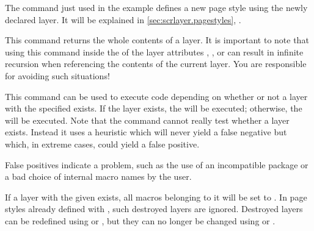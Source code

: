 The 
command just used in the example defines a new page style using the newly
declared layer. It will be explained in \autoref{sec:scrlayer.pagestyles},
.%
\EndIndexGroup


\begin{Declaration}
\end{Declaration}
This command returns the whole contents
of a layer. It is important to note that using this
command inside the  of the layer attributes ,
, or  can result in
infinite recursion when referencing the contents of the current layer. You
are responsible for avoiding such situations!%
\EndIndexGroup


\begin{Declaration}
\end{Declaration}
This command can be used to execute code depending on whether or not a layer
with the specified  exists. If the layer exists, the
 will be executed; otherwise, the  will be
executed. Note that the command cannot really test whether a layer exists.
Instead it uses a heuristic which will never yield a false negative but which,
in extreme cases, could yield a false positive.
\iffalse%
Nevertheless, if the test yields a false positive, something has gone wrong.
For example, this could indicate an incompatible package or that the user is
doing something he or she should not.%
\else
False positives indicate a problem, such as the use of an incompatible package
or a bad choice of internal macro names by the user.
\fi
\EndIndexGroup


\begin{Declaration}
\end{Declaration}
If a layer with the given  exists, all macros belonging to
it will be set to . In page styles already defined with
, such destroyed layers are ignored. Destroyed layers can be
redefined using  or
, but they can no longer be changed using
 or
.%
\EndIndexGroup


